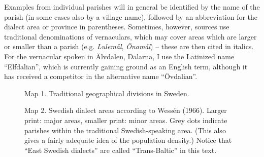 Examples from individual parishes will in general be identified by the name of the parish (in some cases also by a village name), followed by an abbreviation for the dialect area or province in parentheses. Sometimes, however, sources use traditional denominations of vernaculars, which may cover areas which are larger or smaller than a parish (e.g. \textit{Lulemål}, \textit{Önamål}) – these are then cited in italics. For the vernacular spoken in Älvdalen, Dalarna, I use the Latinized name “Elfdalian”, which is currently gaining ground as an English term, although it has received a competitor in the alternative name “Övdalian”.

\clearpage%



\begin{figure}[h]
\centering
\begin{minipage}{5.82292in}
\label{bkm:Ref264031044}Map 1. Traditional geographical divisions in Sweden.
\end{minipage}
\end{figure}
\clearpage%


\begin{figure}[h]
\centering
\begin{minipage}{5.08403in}
Map 2. Swedish dialect areas according to Wessén (1966). Larger print: major areas, smaller print: minor areas. Grey dots indicate parishes within the traditional Swedish-speaking area. (This also gives a fairly adequate idea of the population density.) Notice that “East Swedish dialects” are called “Trans-Baltic” in this text.
\end{minipage}
\end{figure}
\clearpage%



